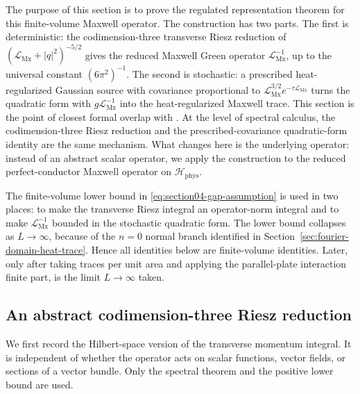 \documentclass[11pt]{article}
\providecommand{\abs}[1]{\left\lvert #1\right\rvert}
\providecommand{\Hphys}{\mathcal H_{\mathrm{phys}}}
\providecommand{\LMx}{\mathcal L_{\mathrm{Mx}}}
\numberwithin{equation}{section}
\begin{document}
The purpose of this section is to prove the regulated representation theorem
for this finite-volume Maxwell operator.  The construction has two parts.  The
first is deterministic: the codimension-three transverse Riesz reduction of
\((\LMx+\abs{q}^2)^{-5/2}\) gives the reduced Maxwell Green operator
\(\LMx^{-1}\), up to the universal constant \((6\pi^2)^{-1}\).  The second is
stochastic: a prescribed heat-regularized Gaussian source with covariance
proportional to \(\LMx^{3/2}e^{-\tau\LMx}\) turns the quadratic form with
\(g\LMx^{-1}\) into the heat-regularized Maxwell trace.
This section is the point of closest formal overlap with
\cite{KhanKhan2026Scalar}.  At the level of spectral calculus, the
codimension-three Riesz reduction and the prescribed-covariance
quadratic-form identity are the same mechanism.  What changes here is the
underlying operator: instead of an abstract scalar operator, we apply the
construction to the reduced perfect-conductor Maxwell operator on \(\Hphys\).

\begin{remark}
\label{rem:finite-volume-inverse-only}
The finite-volume lower bound in \eqref{eq:section04-gap-assumption} is used in
two places: to make the transverse Riesz integral an operator-norm integral and
to make \(\LMx^{-1}\) bounded in the stochastic quadratic form.  The lower bound
collapses as \(L\to\infty\), because of the \(n=0\) normal branch identified in
Section~\ref{sec:fourier-domain-heat-trace}.  Hence all identities below are
finite-volume identities.  Later, only after taking traces per unit area and
applying the parallel-plate interaction finite part, is the limit
\(L\to\infty\) taken.
\end{remark}

\subsection{An abstract codimension-three Riesz reduction}
\label{subsec:abstract-riesz-reduction}

We first record the Hilbert-space version of the transverse momentum integral.
It is independent of whether the operator acts on scalar functions, vector
fields, or sections of a vector bundle.  Only the spectral theorem and the
positive lower bound are used.
\end{document}

